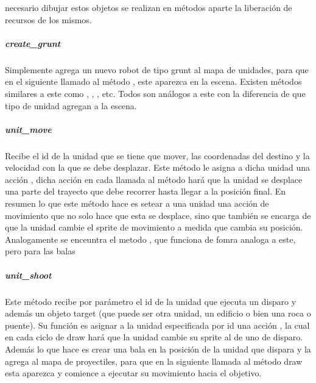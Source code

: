                 necesario dibujar estos objetos se realizan en métodos aparte la
                liberación de recursos de los mismos.
            \subparagraph{create\_grunt}
                Simplemente agrega un nuevo robot de tipo grunt al mapa de unidades,
                para que en el siguiente llamado al método , este
                aparezca en la escena. Existen métodos similares a este como
                , , ,
                etc. Todos son análogos a este con la diferencia de que tipo de
                unidad agregan a la escena.
            \subparagraph{unit\_move}
                Recibe el id de la unidad que se tiene que mover, las coordenadas
                del destino y la velocidad con la que se debe desplazar. Este método
                le asigna a dicha unidad una acción , dicha
                acción en cada llamada al método  hará que la unidad se
                desplace una parte del trayecto que debe recorrer hasta llegar a la
                posición final. En resumen lo que este método hace es setear a una
                unidad una acción de movimiento que no solo hace que esta se
                desplace, sino que también se encarga de que la unidad cambie el
                sprite de movimiento a medida que cambia su posición.\\
                Analogamente se enceuntra el metodo , que
                funciona de fomra analoga a este, pero para las balas
            \subparagraph{unit\_shoot}
                Este método recibe por parámetro el id de la unidad que ejecuta un
                disparo y además un objeto target (que puede ser otra unidad, un
                edificio o bien una roca o puente). Su función es asignar a la
                unidad especificada por id una acción , la
                cual en cada ciclo de draw hará que la unidad cambie su sprite al
                de uno de disparo. Además lo que hace es crear una bala en la
                posición de la unidad que dispara y la agrega al mapa de proyectiles,
                para que en la siguiente llamada al método draw esta aparezca y
                comience a ejecutar su movimiento hacia el objetivo.
